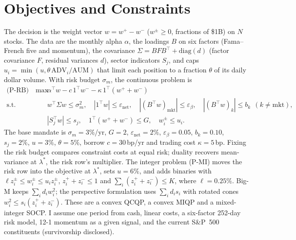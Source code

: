 \documentclass[11pt]{article}
\newcommand{\T}{^{\top}}
\begin{document}
\section{Objectives and Constraints}
The decision is the weight vector $w=w^+-w^-$ ($w^\pm\ge0$, fractions of \$1B) on $N$ stocks. The data are the monthly alpha $\alpha$, the loadings $B$ on six factors (Fama--French five and momentum), the covariance $\Sigma=BFB\T+\mathrm{diag}(d)$ (factor covariance $F$, residual variances $d$), sector indicators $S_j$, and caps $u_i=\min(u,\theta\,\mathrm{ADV}_i/\mathrm{AUM})$ that limit each position to a fraction $\theta$ of its daily dollar volume. With risk budget $\sigma_m$, the continuous problem is
\begin{equation*}
\begin{aligned}
\text{(P-RB)}\quad \max\ \ & \alpha\T w-c\,1\T w^- -\kappa\,1\T(w^++w^-)\\
\text{s.t.}\ \ & w\T\Sigma w\le\sigma_m^2,\quad |1\T w|\le\varepsilon_{\mathrm{net}},\quad |(B\T w)_{\mathrm{mkt}}|\le\varepsilon_\beta,\quad |(B\T w)_k|\le b_k\ \ (k\ne\mathrm{mkt}),\\
& |S_j\T w|\le s_j,\quad 1\T(w^++w^-)\le G,\quad w_i^\pm\le u_i .
\end{aligned}
\end{equation*}
The base mandate is $\sigma_m=3\%$/yr, $G=2$, $\varepsilon_{\mathrm{net}}=2\%$, $\varepsilon_\beta=0.05$, $b_k=0.10$, $s_j=2\%$, $u=3\%$, $\theta=5\%$, borrow $c=30$\,bp/yr and trading cost $\kappa=5$\,bp. Fixing the risk budget compares constraint costs at equal risk; duality recovers mean-variance at $\lambda^*$, the risk row's multiplier. The integer problem (P-MI) moves the risk row into the objective at $\lambda^*$, sets $u=6\%$, and adds binaries with $\ell z_i^\pm\le w_i^\pm\le u_iz_i^\pm$, $z_i^++z_i^-\le1$ and $\sum_i(z_i^++z_i^-)\le K$, where $\ell=0.25\%$. Big-M keeps $\sum_id_iw_i^2$; the perspective formulation uses $\sum_id_is_i$ with rotated cones $w_i^2\le s_i(z_i^++z_i^-)$. These are a convex QCQP, a convex MIQP and a mixed-integer SOCP. I assume one period from cash, linear costs, a six-factor 252-day risk model, 12-1 momentum as a given signal, and the current S\&P~500 constituents (survivorship disclosed).

\end{document}
